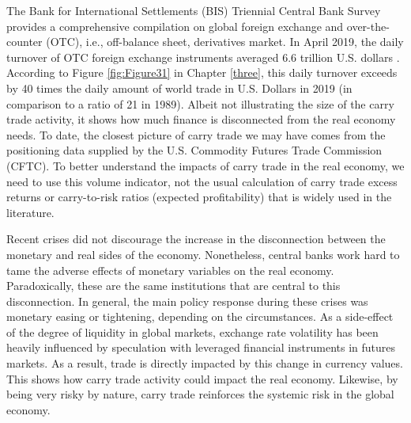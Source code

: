 \documentclass[a4paper, twoside]{templates/ociamthesis}
\begin{document}
The Bank for International Settlements (BIS) Triennial Central Bank Survey provides a comprehensive compilation on global foreign exchange and over-the-counter (OTC), i.e., off-balance sheet, derivatives market. In April 2019, the daily turnover of OTC foreign exchange instruments averaged 6.6 trillion U.S. dollars \autocite{bankforinternationalsettlements2019}. According to Figure \ref{fig:Figure31} in Chapter \ref{three}, this daily turnover exceeds by 40 times the daily amount of world trade in U.S. Dollars in 2019 (in comparison to a ratio of 21 in 1989). Albeit not illustrating the size of the carry trade activity, it shows how much finance is disconnected from the real economy needs. To date, the closest picture of carry trade we may have comes from the positioning data supplied by the U.S. Commodity Futures Trade Commission (CFTC). To better understand the impacts of carry trade in the real economy, we need to use this volume indicator, not the usual calculation of carry trade excess returns or carry-to-risk ratios (expected profitability) that is widely used in the literature.

Recent crises did not discourage the increase in the disconnection between the monetary and real sides of the economy. Nonetheless, central banks work hard to tame the adverse effects of monetary variables on the real economy. Paradoxically, these are the same institutions that are central to this disconnection. In general, the main policy response during these crises was monetary easing or tightening, depending on the circumstances. As a side-effect of the degree of liquidity in global markets, exchange rate volatility has been heavily influenced by speculation with leveraged financial instruments in futures markets. As a result, trade is directly impacted by this change in currency values. This shows how carry trade activity could impact the real economy. Likewise, by being very risky by nature, carry trade reinforces the systemic risk in the global economy.
\end{document}
